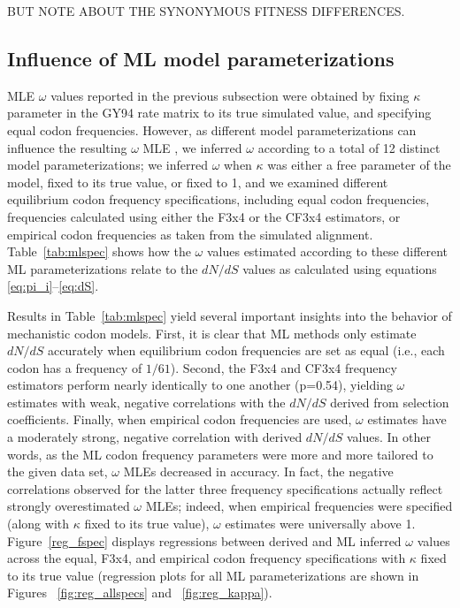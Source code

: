 \documentclass[11pt]{article}
\begin{document}
BUT NOTE ABOUT THE SYNONYMOUS FITNESS DIFFERENCES.


\subsection*{Influence of ML model parameterizations}

MLE $\omega$ values reported in the previous subsection were obtained by fixing $\kappa$ parameter in the GY94 rate matrix to its true simulated value, and specifying equal codon frequencies. However, as different model parameterizations can influence the resulting $\omega$ MLE \cite{YN00,Yang2006,ZhangYu2006}, we inferred $\omega$ according to a total of 12 distinct model parameterizations; we inferred $\omega$ when $\kappa$ was either a free parameter of the model, fixed to its true value, or fixed to 1, and we examined different equilibrium codon frequency specifications, including equal codon frequencies, frequencies calculated using either the F3x4 \cite{MuseGaut1994} or the CF3x4 \cite{Pond2010} estimators, or empirical codon frequencies as taken from the simulated alignment. Table~\ref{tab:mlspec} shows how the $\omega$ values estimated according to these different ML parameterizations relate to the $dN/dS$ values as calculated using equations \eqref{eq:pi_i}--\eqref{eq:dS}. 

Results in Table~\ref{tab:mlspec} yield several important insights into the behavior of mechanistic codon models. First, it is clear that ML methods only estimate $dN/dS$ accurately when equilibrium codon frequencies are set as equal (i.e., each codon has a frequency of $1/61$). Second, the F3x4 and CF3x4 frequency estimators perform nearly identically to one another (p=0.54), yielding $\omega$ estimates with weak, negative correlations with the $dN/dS$ derived from selection coefficients. Finally, when empirical codon frequencies are used, $\omega$ estimates have a moderately strong, negative correlation with derived $dN/dS$ values. In other words, as the ML codon frequency parameters were more and more tailored to the given data set, $\omega$ MLEs decreased in accuracy. In fact, the negative correlations observed for the latter three frequency specifications actually reflect strongly overestimated $\omega$ MLEs; indeed, when empirical frequencies were specified (along with $\kappa$ fixed to its true value), $\omega$ estimates were universally above 1.  Figure~\ref{reg_fspec} displays regressions between derived and ML inferred $\omega$ values across the equal, F3x4, and empirical codon frequency specifications with $\kappa$ fixed to its true value (regression plots for all ML parameterizations are shown in Figures ~\ref{fig:reg_allspecs} and ~\ref{fig:reg_kappa}).
\end{document}
